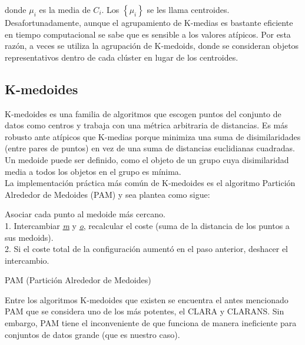 \documentclass[12pt]{report} %
\theoremstyle{definition}
\begin{document}
{\noindent donde $\mu_i$ es la media de $C_i$. Los $\left\lbrace \mu_i \right\rbrace $ se les llama centroides.\\ 

Desafortunadamente, aunque el agrupamiento de K-medias es bastante eficiente en tiempo computacional se sabe que es sensible a los valores atípicos. Por esta razón, a veces se utiliza la agrupación de K-medoids, donde se consideran objetos representativos dentro de cada clúster en lugar de los centroides.

\subsection{K-medoides}

K-medoides es una familia de algoritmos que escogen puntos del conjunto de datos como centros y trabaja con una métrica arbitraria de distancias. Es más robusto ante atípicos que K-medias porque minimiza una suma de disimilaridades (entre pares de puntos) en vez de una suma de distancias euclidianas cuadradas. Un medoide puede ser definido, como el objeto de un grupo cuya disimilaridad media a todos los objetos en el grupo es mínima.\\

La implementación práctica más común de K-medoides es el algoritmo Partición Alrededor de Medoides (PAM) y sea plantea como sigue:\\

\begin{algorithm}[H] 
	\SetAlgoLined
		Asociar cada punto al medoide más cercano.\\
		{
			{
				1. Intercambiar \textit{\underline{m}} y \textit{\underline{o}}, recalcular el coste (suma de la distancia de los puntos a sus medoids).\\
				2. Si el coste total de la configuración aumentó en el paso anterior, deshacer el intercambio.
			}
		}
	\caption{PAM (Partición Alrededor de Medoides)}
\end{algorithm}
\vspace{0.5cm}

Entre los algoritmos K-medoides que existen se encuentra el antes mencionado PAM que se considera uno de los más potentes, el CLARA y CLARANS. Sin embargo, PAM tiene el inconveniente de que funciona de manera ineficiente para conjuntos de datos grande (que es nuestro caso).\cite{pam_chungo}\\

}
\end{document}
